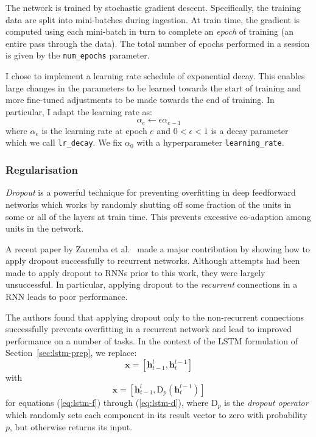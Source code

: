 \documentclass[12pt,a4paper,twoside,openright]{report}
\newcommand{\vect}[1]{\boldsymbol{\mathbf{#1}}}
\begin{document}
The network is trained by stochastic gradient descent. Specifically, the
training data are split into mini-batches during ingestion. At train time, the
gradient is computed using each mini-batch in turn to complete an \emph{epoch}
of training (an entire pass through the data). The total number of epochs
performed in a session is given by the \texttt{num\_epochs} parameter.

I chose to implement a learning rate schedule of exponential decay. This enables
large changes in the parameters to be learned towards the start of training and
more fine-tuned adjustments to be made towards the end of training. In
particular, I adapt the learning rate as:
$$ \alpha_e \gets \epsilon\alpha_{e-1} $$
where $\alpha_e$ is the learning rate at epoch $e$ and $0 < \epsilon < 1$ is a
decay parameter which we call \texttt{lr\_decay}. We fix $\alpha_0$ with a
hyperparameter \texttt{learning\_rate}.

\subsubsection{Regularisation}

\emph{Dropout} \cite{srivastava2014dropout} is a powerful technique for
preventing overfitting in deep feedforward networks which works by randomly
shutting off some fraction of the units in some or all of the layers at train
time. This prevents excessive co-adaption among units in the network.

A recent paper by Zaremba et al.\ \cite{zaremba2014recurrent} made a major
contribution by showing how to apply dropout successfully to recurrent networks.
Although attempts had been made to apply dropout to RNNs prior to this work,
they were largely unsuccessful. In particular, applying dropout to the
\emph{recurrent} connections in a RNN leads to poor performance.

The authors found that applying dropout only to the non-recurrent connections
successfully prevents overfitting in a recurrent network and lead to improved
performance on a number of tasks. In the context of the LSTM formulation of
Section~\ref{sec:lstm-prep}, we replace:
$$ \vect{x} = [\vect{h}_{t-1}^l, \vect{h}_t^{l-1}] $$
with
$$ \vect{x} = [\vect{h}_{t-1}^l, \mathrm{D}_p(\vect{h}_t^{l-1})] $$
for equations (\ref{eq:lstm-f}) through (\ref{eq:lstm-d}), where $\mathrm{D}_p$
is the \emph{dropout operator} which randomly sets each component in its result
vector to zero with probability $p$, but otherwise returns its input. 
\end{document}
